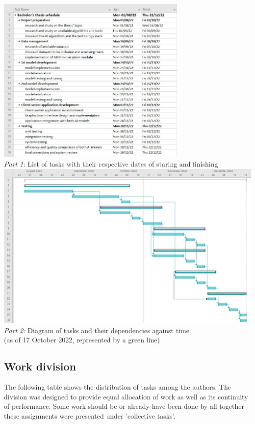 \documentclass{article}
\begin{document}
\begin{center}
    \includegraphics[width=0.7\textwidth]{Gantt_1.jpg} \\
    \textit{Part 1:} List of tasks with their respective dates of staring and finishing
    \vskip10pt \noindent
    \includegraphics[width=1\textwidth]{Gantt_2.jpg} \\
    \textit{Part 2:} Diagram of tasks and their dependencies against time \\ (as of 17 October 2022, represented by a green line)
\end{center}

\subsection{Work division}
The following table shows the distribution of tasks among the authors. The division was designed to provide equal allocation of work as well as its continuity of performance. Some work should be or already have been done by all together - these assignments were presented under 'collective tasks'.
\end{document}
